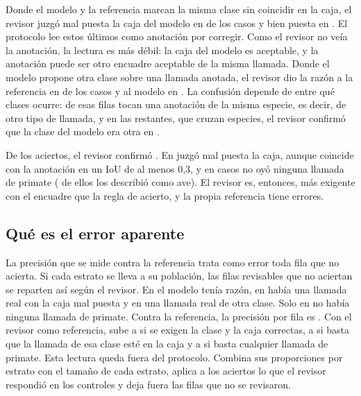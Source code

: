  Donde el modelo y la referencia marcan la
misma clase sin coincidir en la caja, el revisor juzgó mal puesta la caja del
modelo en \uBoxModelFraming{} de los casos y bien puesta en \uBoxModelOk{}. El
protocolo lee estos últimos como anotación por corregir. Como el revisor no veía
la anotación, la lectura es más débil: la caja del modelo es aceptable, y la
anotación puede ser otro encuadre aceptable de la misma llamada. Donde el modelo propone
otra clase sobre una llamada anotada, el revisor dio la razón a la referencia en
\uLabelModelWrong{} de los casos y al modelo en \uLabelModelOk{}. La confusión
depende de entre qué clases ocurre: \uLabelSameSpecies{} de esas \uLabelRows{}
filas tocan una anotación de la misma especie, es decir, de otro tipo de llamada,
y en las \uLabelCross{} restantes, que cruzan especies, el revisor confirmó que la
clase del modelo era otra en \uLabelCrossOther{}.

 De los \uControls{} aciertos, el revisor confirmó
\uControlsOk{}. En \uControlsFraming{} juzgó mal puesta la caja, aunque coincide
con la anotación en un IoU de al menos 0,3, y en \uControlsNoiseN{} casos no oyó
ninguna llamada de primate (\uControlsBird{} de ellos los describió como ave). El
revisor es, entonces, más exigente con el encuadre que la regla de acierto, y la
propia referencia tiene errores.

\subsection{Qué es el error aparente}

La precisión que se mide contra la referencia trata como error toda fila que no
acierta. Si cada estrato se lleva a su población, las \uApparent{} filas
revisables que no aciertan se reparten así según el revisor. En \uApparentCorrect{}
el modelo tenía razón, en \uApparentBox{} había una llamada real con la caja mal
puesta y en \uApparentOther{} una llamada real de otra clase. Solo en
\uApparentNoise{} no había ninguna llamada de primate. Contra la referencia, la
precisión por fila es \uPrecisionRef{}. Con el revisor como referencia, sube a
\uPrecisionStrict{} si se exigen la clase y la caja correctas, a
\uPrecisionLenient{} si basta que la llamada de esa clase esté en la caja y a
\uPrecisionCall{} si basta cualquier llamada de primate. Esta lectura queda fuera
del protocolo. Combina sus proporciones por estrato con el tamaño de cada estrato,
aplica a los \uMatchRows{} aciertos lo que el revisor respondió en los controles y
deja fuera las \uNotReviewed{} filas que no se revisaron.

